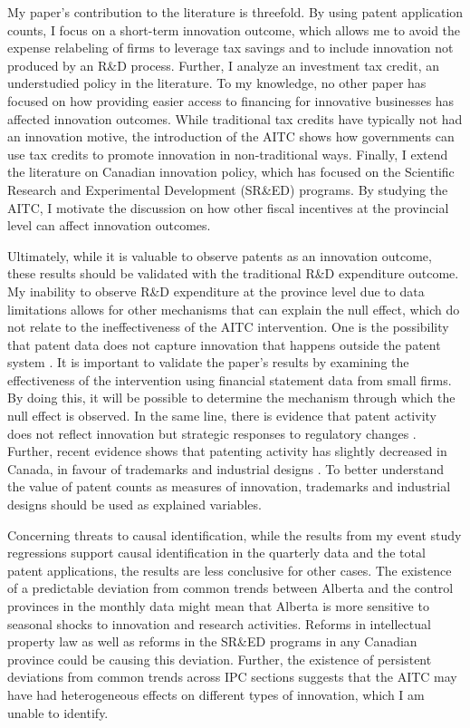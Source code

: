 \documentclass[../main.tex]{subfiles}
\begin{document}
My paper's contribution to the literature is threefold. By using patent application counts, I focus on a short-term innovation outcome, which allows me to avoid the expense relabeling of firms to leverage tax savings and to include innovation not produced by an R\&D process. Further, I analyze an investment tax credit, an understudied policy in the literature. To my knowledge, no other paper has focused on how providing easier access to financing for innovative businesses has affected innovation outcomes. While traditional tax credits have typically not had an innovation motive, the introduction of the AITC shows how governments can use tax credits to promote innovation in non-traditional ways. Finally, I extend the literature on Canadian innovation policy, which has focused on the Scientific Research and Experimental Development (SR\&ED) programs. By studying the AITC, I motivate the discussion on how other fiscal incentives at the provincial level can affect innovation outcomes.

Ultimately, while it is valuable to observe patents as an innovation outcome, these results should be validated with the traditional R\&D expenditure outcome. My inability to observe R\&D expenditure at the province level due to data limitations allows for other mechanisms that can explain the null effect, which do not relate to the ineffectiveness of the AITC intervention. One is the possibility that patent data does not capture innovation that happens outside the patent system \parencite{moser13}. It is important to validate the paper’s results by examining the effectiveness of the intervention using financial statement data from small firms. By doing this, it will be possible to determine the mechanism through which the null effect is observed. In the same line, there is evidence that patent activity does not reflect innovation but strategic responses to regulatory changes \parencite{graham_mowrey04}. Further, recent evidence shows that patenting activity has slightly decreased in Canada, in favour of trademarks and industrial designs \parencite{canadianintellectualpropertyoffice22}. To better understand the value of patent counts as measures of innovation, trademarks and industrial designs should be used as explained variables. 

Concerning threats to causal identification, while the results from my event study regressions support causal identification in the quarterly data and the total patent applications, the results are less conclusive for other cases. The existence of a predictable deviation from common trends between Alberta and the control provinces in the monthly data might mean that Alberta is more sensitive to seasonal shocks to innovation and research activities. Reforms in intellectual property law as well as reforms in the SR\&ED programs in any Canadian province could be causing this deviation. Further, the existence of persistent deviations from common trends across IPC sections suggests that the AITC may have had heterogeneous effects on different types of innovation, which I am unable to identify. 
\end{document}
